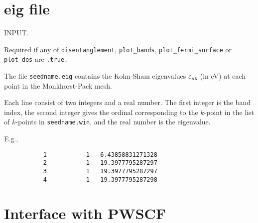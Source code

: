 %


\section{eig file}

INPUT. 

Required if any of \verb#disentanglement#, \verb#plot_bands#,
   \verb#plot_fermi_surface# or \verb#plot_dos# are \verb#.true.#

The file \verb#seedname.eig# contains the Kohn-Sham eigenvalues
     $\varepsilon_{n\mathbf{k}}$ (in eV) at each point in the
     Monkhorst-Pack mesh.

Each line consist of two integers and a real number. The first integer
is the band index, the second integer gives the ordinal corresponding
to the $k$-point in the list of $k$-points in \verb#seedname.win#,
and the real number is the eigenvalue. 

E.g.,

\begin{verbatim}
           1           1  -6.43858831271328
           2           1   19.3977795287297
           3           1   19.3977795287297
           4           1   19.3977795287298
\end{verbatim}


\section{Interface with PWSCF}

